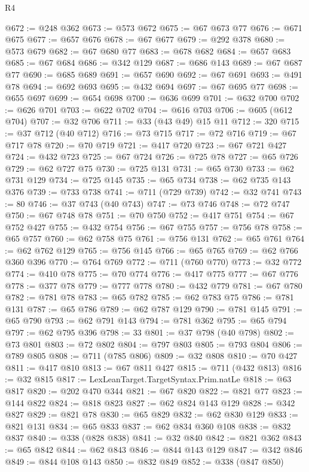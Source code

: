 \begin{lexlean}{R4}
\begin{coremodule}
@672 := @248 @362
@673 := @573 @672
@675 := @67 @673 @77
@676 := @671 @675
@677 := @657 @676
@678 := @67 @677
@679 := @292 @378
@680 := @573 @679
@682 := @67 @680 @77
@683 := @678 @682
@684 := @657 @683
@685 := @67 @684
@686 := @342 @129
@687 := @686 @143
@689 := @67 @687 @77
@690 := @685 @689
@691 := @657 @690
@692 := @67 @691
@693 := @491 @78
@694 := @692 @693
@695 := @432 @694
@697 := @67 @695 @77
@698 := @655 @697
@699 := @654 @698
@700 := @636 @699
@701 := @632 @700
@702 := @626 @701
@703 := @622 @702
@704 := @616 @703
@706 := @605 (@612 @704)
@707 := @32 @706
@711 := @33 (@43 @49) @15 @11
@712 := 320
@715 := @37 @712 (@40 @712)
@716 := @73 @715
@717 := @72 @716
@719 := @67 @717 @78
@720 := @70 @719
@721 := @417 @720
@723 := @67 @721 @427
@724 := @432 @723
@725 := @67 @724
@726 := @725 @78
@727 := @65 @726
@729 := @62 @727 @75
@730 := @725 @131
@731 := @65 @730
@733 := @62 @731 @129
@734 := @725 @145
@735 := @65 @734
@738 := @62 @735 @143 @376
@739 := @733 @738
@741 := @711 (@729 @739)
@742 := @32 @741
@743 := 80
@746 := @37 @743 (@40 @743)
@747 := @73 @746
@748 := @72 @747
@750 := @67 @748 @78
@751 := @70 @750
@752 := @417 @751
@754 := @67 @752 @427
@755 := @432 @754
@756 := @67 @755
@757 := @756 @78
@758 := @65 @757
@760 := @62 @758 @75
@761 := @756 @131
@762 := @65 @761
@764 := @62 @762 @129
@765 := @756 @145
@766 := @65 @765
@769 := @62 @766 @360 @396
@770 := @764 @769
@772 := @711 (@760 @770)
@773 := @32 @772
@774 := @410 @78
@775 := @70 @774
@776 := @417 @775
@777 := @67 @776
@778 := @377 @78
@779 := @777 @778
@780 := @432 @779
@781 := @67 @780
@782 := @781 @78
@783 := @65 @782
@785 := @62 @783 @75
@786 := @781 @131
@787 := @65 @786
@789 := @62 @787 @129
@790 := @781 @145
@791 := @65 @790
@793 := @62 @791 @143
@794 := @781 @362
@795 := @65 @794
@797 := @62 @795 @396
@798 := 33
@801 := @37 @798 (@40 @798)
@802 := @73 @801
@803 := @72 @802
@804 := @797 @803
@805 := @793 @804
@806 := @789 @805
@808 := @711 (@785 @806)
@809 := @32 @808
@810 := @70 @427
@811 := @417 @810
@813 := @67 @811 @427
@815 := @711 (@432 @813)
@816 := @32 @815
@817 := LexLeanTarget.TargetSyntax.Prim.natLe
@818 := @63 @817
@820 := @202 @470 @344
@821 := @67 @820
@822 := @821 @77
@823 := @144 @822
@824 := @818 @823
@827 := @62 @824 @143 @129
@828 := @342 @827
@829 := @821 @78
@830 := @65 @829
@832 := @62 @830 @129
@833 := @821 @131
@834 := @65 @833
@837 := @62 @834 @360 @108
@838 := @832 @837
@840 := @338 (@828 @838)
@841 := @32 @840
@842 := @821 @362
@843 := @65 @842
@844 := @62 @843
@846 := @844 @143 @129
@847 := @342 @846
@849 := @844 @108 @143
@850 := @832 @849
@852 := @338 (@847 @850)

\end{coremodule}
\end{lexlean}
